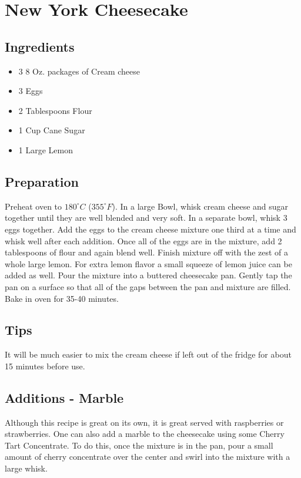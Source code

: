 \thispagestyle{fancy}
\section{New York Cheesecake}
\AddToShipoutPicture*{\Cheesecake}

\subsection*{Ingredients}
\begin{multicols}{2}
	\begin{itemize}
		\item 3 8 Oz. packages of Cream cheese
		\item 3 Eggs
		\item 2 Tablespoons Flour
		\item 1 Cup Cane Sugar
		\item 1 Large Lemon
	\end{itemize}
\end{multicols}

\subsection*{Preparation}
Preheat oven to $180^\circ C$ ($355^\circ F$). In a large Bowl, whisk cream cheese and sugar together until they are well blended and very soft. In a separate bowl, whisk 3 eggs together. Add the eggs to the cream cheese mixture one third at a time and whisk well after each addition. Once all of the eggs are in the mixture, add 2 tablespoons of flour and again blend well. Finish mixture off with the zest of a whole large lemon. For extra lemon flavor a small squeeze of lemon juice can be added as well. Pour the mixture into a buttered cheesecake pan. Gently tap the pan on a surface so that all of the gaps between the pan and mixture are filled. Bake in oven for 35-40 minutes.

\subsection*{Tips}
It will be much easier to mix the cream cheese if left out of the fridge for about 15 minutes before use.

\subsection*{Additions - Marble}
Although this recipe is great on its own, it is great served with raspberries or strawberries. One can also add a marble to the cheesecake using some Cherry Tart Concentrate. To do this, once the mixture is in the pan, pour a small amount of cherry concentrate over the center and swirl into the mixture with a large whisk.


